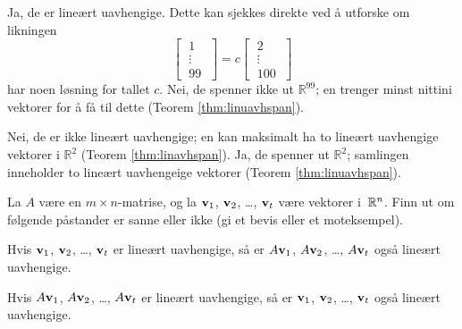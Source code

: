 \begin{losning}

\begin{punkt}
Ja, de er lineært uavhengige. Dette kan sjekkes direkte ved å utforske om likningen 
\[ 
\begin{bmatrix} 
\;1\; \\ 
\;\vdots\; \\ 
\;99\; 
\end{bmatrix}
=c
\begin{bmatrix} 
\;2\; \\ 
\;\vdots\; \\ 
\;100\; 
\end{bmatrix}
\] har noen løsning for tallet $c$. Nei, de spenner ikke ut $\mathbb{R}^{99}$; en trenger minst nittini vektorer for å få til dette (Teorem \ref{thm:linuavhspan}).
\end{punkt}

\begin{punkt}
Nei, de er ikke lineært uavhengige; en kan maksimalt ha to lineært uavhengige vektorer i $\mathbb{R}^2$ (Teorem \ref{thm:linavhspan}). Ja, de spenner ut $\mathbb{R}^2$; samlingen inneholder to lineært uavhengeige vektorer (Teorem \ref{thm:linuavhspan}).
\end{punkt}

\end{losning}


\begin{oppgave}
La $A$ være en $m \times n$-matrise, og la $\mathbf{v}_1$, $\mathbf{v}_2$,
\ldots, $\mathbf{v}_t$ være vektorer i~$\mathbb{R}^n$.  Finn ut om følgende
påstander er sanne eller ikke (gi et bevis eller et moteksempel).
\begin{punkt}
Hvis $\mathbf{v}_1$, $\mathbf{v}_2$, \ldots, $\mathbf{v}_t$ er lineært uavhengige, så
er $A \mathbf{v}_1$, $A \mathbf{v}_2$, \ldots, $A \mathbf{v}_t$ også lineært
uavhengige.
\end{punkt}
\begin{punkt}
Hvis $A \mathbf{v}_1$, $A \mathbf{v}_2$, \ldots, $A \mathbf{v}_t$ er lineært
uavhengige, så er $\mathbf{v}_1$, $\mathbf{v}_2$, \ldots, $\mathbf{v}_t$ også lineært
uavhengige.
\end{punkt}
\end{oppgave}

